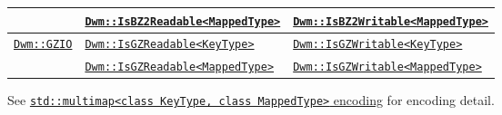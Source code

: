 \begin{minipage}{\textwidth}
\begin{small}
\begin{tabular}{lll}
 & \hyperref[concept:DwmIsBZ2Readable]{\texttt{Dwm::IsBZ2Readable<MappedType>}} & \hyperref[concept:DwmIsBZ2Writable]{\texttt{Dwm::IsBZ2Writable<MappedType>}} \\ \hline
\multirow{2}{*}{\hyperref[section:DwmGZIOClass]{\texttt{Dwm::GZIO}}} & \hyperref[concept:DwmIsGZReadable]{\texttt{Dwm::IsGZReadable<KeyType>}} & \hyperref[concept:DwmIsGZWritable]{\texttt{Dwm::IsGZWritable<KeyType>}} \\
 & \hyperref[concept:DwmIsGZReadable]{\texttt{Dwm::IsGZReadable<MappedType>}} & \hyperref[concept:DwmIsGZWritable]{\texttt{Dwm::IsGZWritable<MappedType>}} \\
\end{tabular}
\end{small}
\vspace{1ex}

See \hyperref[encoding:stdMultimap]{\texttt{std::multimap<class KeyType,%
 class MappedType>} encoding} for encoding detail.
\end{minipage}


